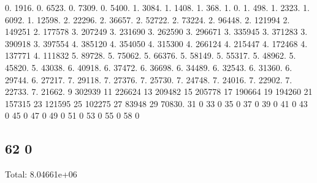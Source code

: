 0. 1916. 0. 6523. 0. 7309. 0. 5400. 1. 3084. 1. 1408. 1. 368. 1. 0. 1. 498. 1. 2323. 1. 6092. 1. 12598. 2. 22296. 2. 36657. 2. 52722. 2. 73224. 2. 96448. 2. 121994 2. 149251 2. 177578 3. 207249 3. 231690 3. 262590 3. 296671 3. 335945 3. 371283 3. 390918 3. 397554 4. 385120 4. 354050 4. 315300 4. 266124 4. 215447 4. 172468 4. 137771 4. 111832 5. 89728. 5. 75062. 5. 66376. 5. 58149. 5. 55317. 5. 48962. 5. 45820. 5. 43038. 6. 40918. 6. 37472. 6. 36698. 6. 34489. 6. 32543. 6. 31360. 6. 29744. 6. 27217. 7. 29118. 7. 27376. 7. 25730. 7. 24748. 7. 24016. 7. 22902. 7. 22733. 7. 21662. 9 302939 11 226624 13 209482 15 205778 17 190664 19 194260 21 157315 23 121595 25 102275 27 83948 29 70830. 31 0 33 0 35 0 37 0 39 0 41 0 43 0 45 0 47 0 49 0 51 0 53 0 55 0 58 0 \subsection*{62 0 }

Total\+: 8.\+04661e+06 